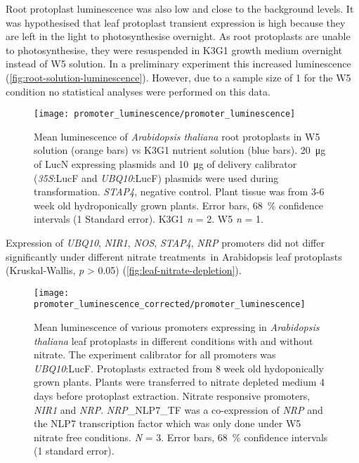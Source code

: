 Root protoplast luminescence was also low and close to the background
levels. It was hypothesised that leaf protoplast transient expression is high because they are left in the light to photosynthesise overnight. As root protoplasts are unable to photosynthesise, they were resuspended in K3G1 growth medium overnight instead of W5 solution. In a preliminary
experiment this increased luminescence
(\autoref{fig:root-solution-luminescence}). However, due to a sample size of 1 for the W5 condition no statistical analyses were performed on this data.

\begin{figure}[!h]
\begin{center}
\capstart
\texttt{[image: promoter\_luminescence/promoter\_luminescence]}
\caption{
Mean luminescence of \textit{Arabidopsis thaliana} root protoplasts in W5 solution (orange bars) vs K3G1 nutrient solution (blue bars). \SI{20}{\micro\gram} of
LucN expressing plasmids and \SI{10}{\micro\gram} of delivery calibrator
(\textit{35S}:LucF and \textit{UBQ10}:LucF) plasmids were used during
transformation. \textit{STAP4}, negative control. Plant tissue was from 3-6 week old hydroponically grown plants. Error bars, \SI{68}{\percent} confidence intervals (1 Standard error). K3G1 \textit{n} = 2. W5 \textit{n} = 1.
\label{fig:root-solution-luminescence}
}
\end{center}
\end{figure}

Expression of \textit{UBQ10}, \textit{NIR1}, \textit{NOS}, \textit{STAP4}, \textit{NRP} promoters did not differ significantly under different nitrate treatments~in Arabidopsis leaf protoplasts (Kruskal\hyp{}Wallis, \textit{p} \textgreater{} 0.05) (\autoref{fig:leaf-nitrate-depletion}).

\begin{figure}[!h]
\begin{center}
\capstart
\texttt{[image: promoter\_luminescence\_corrected/promoter\_luminescence]}
\caption{
Mean luminescence of various promoters expressing in \textit{Arabidopsis thaliana} leaf protoplasts in different conditions with and without nitrate. The experiment calibrator for all promoters was \textit{UBQ10}:LucF. Protoplasts extracted from 8 week old hydoponically grown plants. Plants were transferred to nitrate depleted medium 4 days before protoplast extraction. Nitrate responsive promoters, \textit{NIR1}
and \textit{NRP}. \textit{NRP}\_NLP7\_TF was a co\hyp{}expression of \textit{NRP} and the NLP7 transcription factor which was only done under W5 nitrate free conditions. \textit{N} = 3. Error bars, \SI{68}{\percent} confidence intervals (1 standard error).
\label{fig:leaf-nitrate-depletion}
}
\end{center}
\end{figure}

